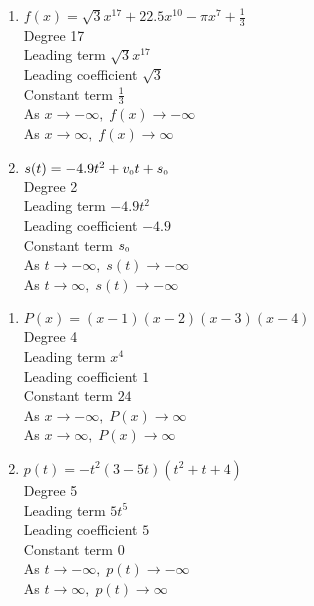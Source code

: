 \documentclass{ximera}
\begin{document}
\begin{multicols}{2}
\begin{enumerate}
\setcounter{enumi}{\value{HW}}

\item $f(x) = \sqrt{3}x^{17} + 22.5x^{10} - \pi x^{7} + \frac{1}{3}$\\
Degree 17 \\
Leading term $\sqrt{3}x^{17}$\\
Leading coefficient $\sqrt{3}$\\
Constant term $\frac{1}{3}$\\
As $x \rightarrow -\infty, \; f(x) \rightarrow -\infty$\\
As $x \rightarrow \infty, \; f(x) \rightarrow \infty$\\


\item $s(t) = -4.9t^{2} + v_{\mbox{\tiny $0$}}t + s_{\mbox{\tiny $0$}}$\\
Degree 2 \\
Leading term $-4.9t^{2}$\\
Leading coefficient $-4.9$\\
Constant term $s_{\mbox{\tiny $0$}}$\\
As $t \rightarrow -\infty, \; s(t) \rightarrow -\infty$\\
As $t \rightarrow \infty, \; s(t) \rightarrow -\infty$\\


\setcounter{HW}{\value{enumi}}
\end{enumerate}
\end{multicols}

\begin{multicols}{2}
\begin{enumerate}
\setcounter{enumi}{\value{HW}}


\item $P(x) = (x - 1)(x - 2)(x - 3)(x - 4)$\\
Degree 4 \\
Leading term $x^{4}$\\
Leading coefficient $1$\\
Constant term $24$\\
As $x \rightarrow -\infty, \; P(x) \rightarrow \infty$\\
As $x \rightarrow \infty, \; P(x) \rightarrow \infty$\\

\item $p(t) = -t^2(3 - 5t)(t^{2} + t + 4)$\\
Degree 5 \\
Leading term $5t^{5}$\\
Leading coefficient $5$\\
Constant term $0$\\
As $t \rightarrow -\infty, \; p(t) \rightarrow -\infty$\\
As $t \rightarrow \infty, \; p(t) \rightarrow \infty$\\

\setcounter{HW}{\value{enumi}}
\end{enumerate}
\end{multicols}
\end{document}
